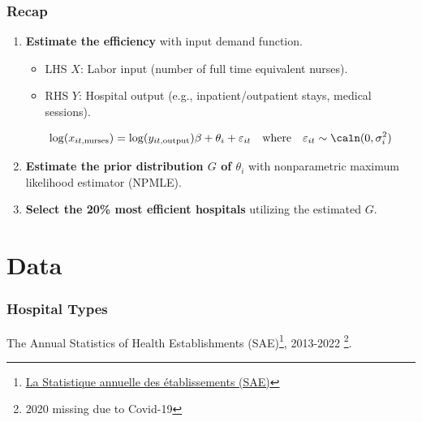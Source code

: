 \documentclass[10pt,mathserif,aspectratio=169]{beamer}
\begin{document}
\begin{frame}
  \frametitle{Recap}
  \begin{enumerate}\itemsep=12pt
    \item \textbf{Estimate the efficiency} with input demand function.
          \begin{itemize} \itemsep=8pt
            \item LHS $X$: Labor input (number of full time equivalent nurses).
            \item RHS $Y$: Hospital output (e.g., inpatient/outpatient stays, medical sessions).
          \end{itemize}
          \begin{equation*}
            \log(x_{it,\text{nurses}}) = \log(y_{it,\text{output}})\beta +\theta_i +\varepsilon_{it} \quad \text{where}\quad \varepsilon_{it} \sim \caln(0,\sigma_i^2)
          \end{equation*}
    \item \textbf{Estimate the prior distribution $G$ of $\theta_i$} with nonparametric maximum likelihood estimator (NPMLE).
    \item \textbf{Select the 20\% most efficient hospitals} utilizing the estimated $G$.

  \end{enumerate}
\end{frame}

\section{Data}

\begin{frame}
  \frametitle{Hospital Types}
  The Annual Statistics of Health
  Establishments
  (SAE)\footnote{\href{https://data.drees.solidarites-sante.gouv.fr/explore/dataset/708_bases-statistiques-sae/information/}{La
      Statistique annuelle des établissements (SAE)}}, 2013-2022 \footnote{2020 missing due to Covid-19}.
  \begin{table}

    \begin{adjustbox}{width=0.8\textwidth,center}
      \centering
      
    \end{adjustbox}
  \end{table}
\end{frame}
\end{document}
